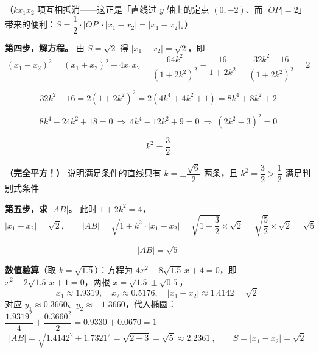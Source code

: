 \begin{answer}
（$kx_1x_2$ 项互相抵消——这正是「直线过 $y$ 轴上的定点 $(0,-2)$、而 $|OP|=2$」带来的便利：$S=\dfrac12\cdot|OP|\cdot\left|x_1-x_2\right|=\left|x_1-x_2\right|$。）

\textbf{第四步，解方程。} 由 $S=\sqrt2$ 得 $\left|x_1-x_2\right|=\sqrt2$，即
\nopagebreak[4]
\[\left(x_1-x_2\right)^2=\left(x_1+x_2\right)^2-4x_1x_2=\frac{64k^2}{\left(1+2k^2\right)^2}-\frac{16}{1+2k^2}=\frac{32k^2-16}{\left(1+2k^2\right)^2}=2\]

\nopagebreak[4]
\[32k^2-16=2\left(1+2k^2\right)^2=2\left(4k^4+4k^2+1\right)=8k^4+8k^2+2\]

\nopagebreak[4]
\[8k^4-24k^2+18=0\ \Longrightarrow\ 4k^4-12k^2+9=0\ \Longrightarrow\ \left(2k^2-3\right)^2=0\]

\nopagebreak[4]
\[k^2=\frac32\]

\textbf{（完全平方！）} 说明满足条件的直线只有 $k=\pm\dfrac{\sqrt6}{2}$ 两条，且 $k^2=\dfrac32>\dfrac12$ 满足判别式条件 

\textbf{第五步，求 $|AB|$。} 此时 $1+2k^2=4$，
\nopagebreak[4]
\[\left|x_1-x_2\right|=\sqrt2,\qquad |AB|=\sqrt{1+k^2}\cdot\left|x_1-x_2\right|=\sqrt{1+\frac32}\times\sqrt2=\sqrt{\frac52}\times\sqrt2=\sqrt5\]

\nopagebreak[4]
\[\boxed{|AB|=\sqrt5}\]

\begin{gktip}
\textbf{数值验算}（取 $k=\sqrt{1.5}$）：方程为 $4x^2-8\sqrt{1.5}\,x+4=0$，即 $x^2-2\sqrt{1.5}\,x+1=0$，两根 $x=\sqrt{1.5}\pm\sqrt{0.5}$，
\nopagebreak[4]
\[x_1\approx1.9319,\quad x_2\approx0.5176,\quad \left|x_1-x_2\right|\approx1.4142=\sqrt2\ \]
对应 $y_1\approx0.3660$、$y_2\approx-1.3660$，代入椭圆：$\dfrac{1.9319^2}{4}+\dfrac{0.3660^2}{2}=0.9330+0.0670=1$ 
\nopagebreak[4]
\[|AB|=\sqrt{1.4142^2+1.7321^2}=\sqrt{2+3}=\sqrt5\approx2.2361\ ,\qquad S=\left|x_1-x_2\right|=\sqrt2\ \]
\end{gktip}



\par\medskip

\end{answer}
